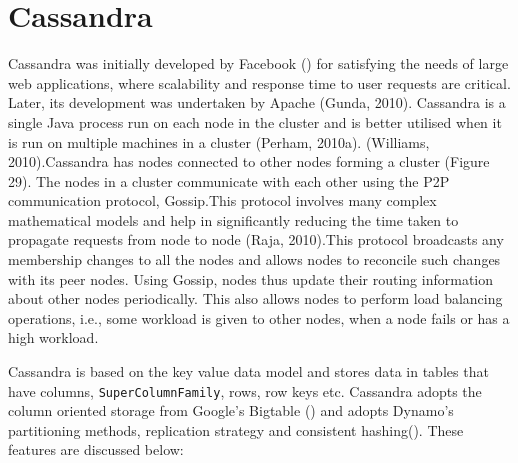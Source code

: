 \section{Cassandra} \label{s:cassandra}
Cassandra was initially developed by Facebook () for satisfying the
needs of large web applications, where scalability and response time to user
requests are critical. Later, its development was undertaken by Apache (Gunda,
2010).
Cassandra is a single Java process run on each node in the cluster and is better
utilised when it is run on multiple machines in a cluster (Perham, 2010a).
(Williams, 2010).Cassandra has nodes connected to other nodes forming a cluster
(Figure 29). The nodes in a cluster communicate with each other using the P2P
communication protocol, Gossip.This protocol involves many complex mathematical
models and help in significantly reducing the time taken to propagate requests
from node to node (Raja, 2010).This protocol broadcasts any
membership changes to all the nodes and allows nodes to reconcile such changes
with its peer nodes. Using Gossip, nodes thus update their routing information
about other nodes periodically. This also allows nodes to perform load balancing
operations, i.e., some workload is given to other nodes, when a node fails or
has a high workload.

Cassandra is based on the key value data model and stores data in tables
that have columns, \texttt{SuperColumnFamily}, rows, row keys etc. Cassandra
adopts the column oriented storage from Google's Bigtable () and
adopts Dynamo's partitioning methods, replication strategy and consistent
hashing(). These features are discussed below:

